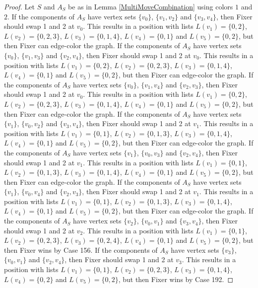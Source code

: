 \documentclass[12pt]{amsart}
\theoremstyle{plain}
\theoremstyle{definition}
\theoremstyle{remark}
\begin{document}
\begin{proof}
Let $S$ and $A_S$ be as in Lemma \ref{MultiMoveCombination} using colors $1$ and $2$. If the components of $A_S$ have vertex sets $\{v_0\}$, $\{v_1, v_2\}$ and $\{v_3, v_4\}$, then Fixer should swap 1 and 2 at $v_0$. This results in a position with lists $L(v_1) = \{0, 2\}$, $L(v_2) = \{0, 2, 3\}$, $L(v_3) = \{0, 1, 4\}$, $L(v_4) = \{0, 1\}$ and $L(v_5) = \{0, 2\}$, but then Fixer can edge-color the graph.
If the components of $A_S$ have vertex sets $\{v_0\}$, $\{v_1, v_3\}$ and $\{v_2, v_4\}$, then Fixer should swap 1 and 2 at $v_0$. This results in a position with lists $L(v_1) = \{0, 2\}$, $L(v_2) = \{0, 2, 3\}$, $L(v_3) = \{0, 1, 4\}$, $L(v_4) = \{0, 1\}$ and $L(v_5) = \{0, 2\}$, but then Fixer can edge-color the graph.
If the components of $A_S$ have vertex sets $\{v_0\}$, $\{v_1, v_4\}$ and $\{v_2, v_3\}$, then Fixer should swap 1 and 2 at $v_0$. This results in a position with lists $L(v_1) = \{0, 2\}$, $L(v_2) = \{0, 2, 3\}$, $L(v_3) = \{0, 1, 4\}$, $L(v_4) = \{0, 1\}$ and $L(v_5) = \{0, 2\}$, but then Fixer can edge-color the graph.
If the components of $A_S$ have vertex sets $\{v_1\}$, $\{v_0, v_2\}$ and $\{v_3, v_4\}$, then Fixer should swap 1 and 2 at $v_1$. This results in a position with lists $L(v_1) = \{0, 1\}$, $L(v_2) = \{0, 1, 3\}$, $L(v_3) = \{0, 1, 4\}$, $L(v_4) = \{0, 1\}$ and $L(v_5) = \{0, 2\}$, but then Fixer can edge-color the graph.
If the components of $A_S$ have vertex sets $\{v_1\}$, $\{v_0, v_3\}$ and $\{v_2, v_4\}$, then Fixer should swap 1 and 2 at $v_1$. This results in a position with lists $L(v_1) = \{0, 1\}$, $L(v_2) = \{0, 1, 3\}$, $L(v_3) = \{0, 1, 4\}$, $L(v_4) = \{0, 1\}$ and $L(v_5) = \{0, 2\}$, but then Fixer can edge-color the graph.
If the components of $A_S$ have vertex sets $\{v_1\}$, $\{v_0, v_4\}$ and $\{v_2, v_3\}$, then Fixer should swap 1 and 2 at $v_1$. This results in a position with lists $L(v_1) = \{0, 1\}$, $L(v_2) = \{0, 1, 3\}$, $L(v_3) = \{0, 1, 4\}$, $L(v_4) = \{0, 1\}$ and $L(v_5) = \{0, 2\}$, but then Fixer can edge-color the graph.
If the components of $A_S$ have vertex sets $\{v_2\}$, $\{v_0, v_1\}$ and $\{v_3, v_4\}$, then Fixer should swap 1 and 2 at $v_2$. This results in a position with lists $L(v_1) = \{0, 1\}$, $L(v_2) = \{0, 2, 3\}$, $L(v_3) = \{0, 2, 4\}$, $L(v_4) = \{0, 1\}$ and $L(v_5) = \{0, 2\}$, but then Fixer wins by Case 156.
If the components of $A_S$ have vertex sets $\{v_3\}$, $\{v_0, v_1\}$ and $\{v_2, v_4\}$, then Fixer should swap 1 and 2 at $v_3$. This results in a position with lists $L(v_1) = \{0, 1\}$, $L(v_2) = \{0, 2, 3\}$, $L(v_3) = \{0, 1, 4\}$, $L(v_4) = \{0, 2\}$ and $L(v_5) = \{0, 2\}$, but then Fixer wins by Case 192.

\end{proof}
\end{document}
